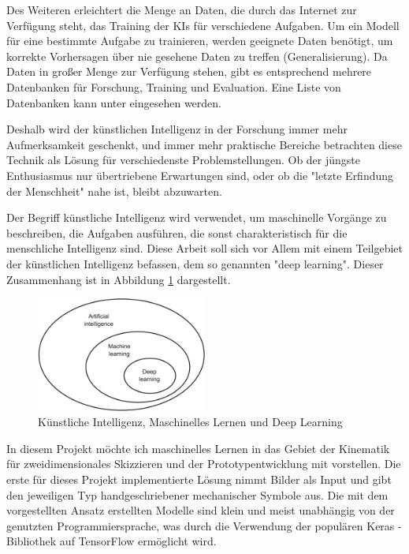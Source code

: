 Des Weiteren erleichtert die Menge an Daten, die durch das Internet zur Verfügung steht, das Training der KIs für verschiedene Aufgaben.
Um ein Modell für eine bestimmte Aufgabe zu trainieren, werden geeignete Daten benötigt, um korrekte Vorhersagen über nie gesehene Daten zu treffen (Generalisierung).
Da Daten in großer Menge zur Verfügung stehen, gibt es entsprechend mehrere Datenbanken für Forschung, Training und Evaluation.
Eine Liste von Datenbanken kann unter  eingesehen werden.

Deshalb wird der künstlichen Intelligenz in der Forschung immer mehr Aufmerksamkeit geschenkt, und immer mehr praktische Bereiche betrachten diese Technik als Lösung für verschiedenste Problemstellungen.
Ob der jüngste Enthusiasmus nur übertriebene Erwartungen sind, oder ob die "letzte Erfindung der Menschheit" \cite{Good1965} nahe ist, bleibt abzuwarten.

Der Begriff künstliche Intelligenz wird verwendet, um maschinelle Vorgänge zu beschreiben, die Aufgaben ausführen, die sonst charakteristisch für die menschliche Intelligenz sind.
Diese Arbeit soll sich vor Allem mit einem Teilgebiet der künstlichen Intelligenz befassen, dem so genannten "deep learning".
Dieser Zusammenhang ist in Abbildung \ref{fig:ai_ml_dl} dargestellt.

\begin{figure}
    \includegraphics[width=0.5\textwidth]{images/ai_ml_dl.png}
    \caption{Künstliche Intelligenz, Maschinelles Lernen und Deep Learning \cite[p.4]{Chollet2017}}
    \label{fig:ai_ml_dl}
\end{figure}

In diesem Projekt möchte ich maschinelles Lernen in das Gebiet der Kinematik für zweidimensionales Skizzieren und der Prototypentwicklung mit  vorstellen.
Die erste für dieses Projekt implementierte Lösung nimmt Bilder als Input und gibt den jeweiligen Typ handgeschriebener mechanischer Symbole aus.
Die mit dem vorgestellten Ansatz erstellten Modelle sind klein und meist unabhängig von der genutzten Programmiersprache, was durch die Verwendung der populären Keras \cite{Chollet}-Bibliothek auf TensorFlow \cite{Google2019} ermöglicht wird.

